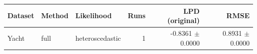 \begin{tabular}{lllrrr}
\toprule
Dataset & Method & Likelihood & Runs & LPD (original) & RMSE \\
\midrule
Yacht & full & heteroscedastic & 1 & -0.8361 $\pm$ 0.0000 & 0.8931 $\pm$ 0.0000 \\
\bottomrule
\end{tabular}
